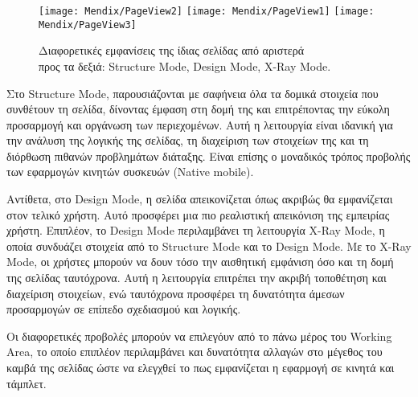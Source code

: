             \begin{figure}[h!] \noindent \centering
                    \texttt{[image: Mendix/PageView2]}
                    \texttt{[image: Mendix/PageView1]}
                    \texttt{[image: Mendix/PageView3]}
                    \caption{\centering Διαφορετικές εμφανίσεις της ίδιας σελίδας από αριστερά \\ προς τα δεξιά: Structure Mode, Design Mode, X-Ray Mode.}
            \end{figure}

            Στο Structure Mode, παρουσιάζονται με σαφήνεια όλα τα δομικά στοιχεία που συνθέτουν τη σελίδα, δίνοντας έμφαση στη δομή της και επιτρέποντας την εύκολη προσαρμογή και οργάνωση των περιεχομένων. Αυτή η λειτουργία είναι ιδανική για την ανάλυση της λογικής της σελίδας, τη διαχείριση των στοιχείων της και τη διόρθωση πιθανών προβλημάτων διάταξης. Είναι επίσης ο μοναδικός τρόπος προβολής των εφαρμογών κινητών συσκευών (Native mobile).

            Αντίθετα, στο Design Mode, η σελίδα απεικονίζεται όπως ακριβώς θα εμφανίζεται στον τελικό χρήστη. Αυτό προσφέρει μια πιο ρεαλιστική απεικόνιση της εμπειρίας χρήστη. Επιπλέον, το Design Mode περιλαμβάνει τη λειτουργία X-Ray Mode, η οποία συνδυάζει στοιχεία από το Structure Mode και το Design Mode. Με το X-Ray Mode, οι χρήστες μπορούν να δουν τόσο την αισθητική εμφάνιση όσο και τη δομή της σελίδας ταυτόχρονα. Αυτή η λειτουργία επιτρέπει την ακριβή τοποθέτηση και διαχείριση στοιχείων, ενώ ταυτόχρονα προσφέρει τη δυνατότητα άμεσων προσαρμογών σε επίπεδο σχεδιασμού και λογικής.

            Οι διαφορετικές προβολές μπορούν να επιλεγόυν από το πάνω μέρος του Working Area, το οποίο επιπλέον περιλαμβάνει και δυνατότητα αλλαγών στο μέγεθος του καμβά της σελίδας ώστε να ελεγχθεί το πως εμφανίζεται η εφαρμογή σε κινητά και τάμπλετ.


